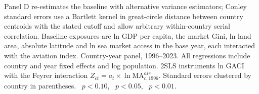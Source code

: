 \begin{table}[H]
\begin{threeparttable}
\begin{tablenotes}\small
\item Panel D re-estimates the baseline with alternative variance estimators; Conley standard errors use a Bartlett kernel in great-circle distance between country centroids with the stated cutoff and allow arbitrary within-country serial correlation. Baseline exposures are ln GDP per capita, the market Gini, ln land area, absolute latitude and ln sea market access in the base year, each interacted with the aviation index. Country-year panel, 1996--2023. All regressions include country and year fixed effects and log population. 2SLS instruments ln GACI with the Feyrer interaction $Z_{ct}=a_t\times\ln \mathrm{MA}^{air}_{c,1996}$. Standard errors clustered by country in parentheses. \sym{*}~$p<0.10$, \sym{**}~$p<0.05$, \sym{***}~$p<0.01$.
\end{tablenotes}
\end{threeparttable}
\end{table}
